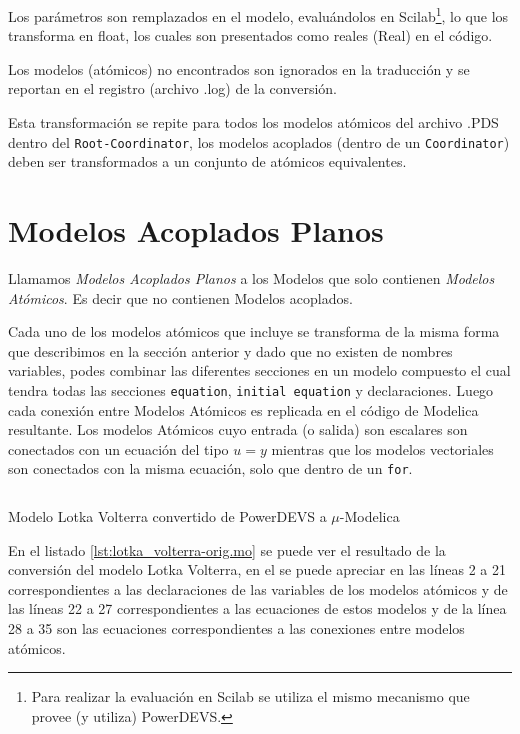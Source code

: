         Los parámetros son remplazados en el modelo, evaluándolos en Scilab\footnote{Para realizar la evaluación en Scilab se utiliza el mismo mecanismo que 
        provee (y utiliza) PowerDEVS.}, lo que los transforma en float, los cuales son presentados como reales (Real) en el código.

        Los modelos (atómicos) no encontrados son ignorados en la traducción y se reportan en el registro (archivo .log) de la conversión.

        Esta transformación se repite para todos los modelos atómicos del archivo .PDS dentro del \texttt{Root-Coordinator}, los modelos acoplados 
        (dentro de un \texttt{Coordinator}) deben ser transformados a un conjunto de atómicos equivalentes.

\section{Modelos Acoplados Planos}

        Llamamos \emph{Modelos Acoplados Planos} a los Modelos que solo contienen \emph{Modelos Atómicos}. Es decir que no contienen Modelos acoplados.

        Cada uno de los modelos atómicos que incluye se transforma de la misma forma que describimos en la sección anterior y dado que no existen  
        de nombres variables, podes combinar las diferentes secciones en un modelo compuesto el cual tendra todas las secciones \texttt{equation}, \texttt{initial equation} y declaraciones.
        Luego cada conexión entre Modelos Atómicos es replicada en el código de Modelica resultante. Los modelos Atómicos cuyo entrada (o salida) son escalares son conectados con un ecuación 
        del tipo $u = y$ mientras que los modelos vectoriales son conectados con la misma ecuación, solo que dentro de un \texttt{for}.

\begin{listing}[H]
        \inputminted[linenos]{modelica}{src/lotka_volterra-orig.mo}
        \caption{Modelo Lotka Volterra convertido de PowerDEVS a $\mu$-Modelica}
        \label{lst:lotka_volterra-orig.mo}
\end{listing}

        En el listado \ref{lst:lotka_volterra-orig.mo} se puede ver el resultado de la conversión del modelo Lotka Volterra, en el se puede apreciar en las líneas 
        2 a 21 correspondientes a las declaraciones de las variables de los modelos atómicos y de las líneas 22 a 27 correspondientes a las ecuaciones de estos 
        modelos y de la línea 28 a 35 son las ecuaciones correspondientes a las conexiones entre modelos atómicos.

